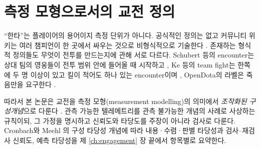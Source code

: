 \section{측정 모형으로서의 교전 정의}
\label{sec:rel-validity}

``한타''는 플레이어의 용어이지 측정 단위가 아니다. 공식적인 정의는 없고 커뮤니티 위키는 여러 챔피언이 한 곳에서 싸우는 것으로 비형식적으로 기술한다 \cite{lolwiki2026terminology}. 존재하는 형식적 정의들도 무엇이 전투를 만드는지에 관해 서로 다르다. Schubert 등의 encounter는 상대 팀의 영웅들이 전투 범위 안에 들어올 때 시작하고 \cite{schubert2016encounter}, Ke 등의 team fight는 한쪽에 두 명 이상이 있고 킬이 적어도 하나 있는 encounter이며 \cite{ke2022}, OpenDota의 라벨은 죽음만을 요구한다 \cite{opendota2018processteamfights,tot2021camera}.

따라서 본 논문은 교전을 측정 모형(measurement modelling)의 의미에서 \emph{조작화된 구성개념}으로 다룬다 \cite{jacobs2021measurement}. 관측 가능한 텔레메트리를 관측 불가능한 개념의 사례로 사상하는 규칙이되, 그 가정을 명시하고 신뢰도와 타당도를 주장이 아니라 검사로 다룬다. Cronbach와 Meehl \cite{cronbach1955construct}의 구성 타당성 개념에 따라 내용·수렴·판별 타당성과 검사--재검사 신뢰도, 예측 타당성을 제 \ref{ch:engagement} 장 끝에서 항목별로 요약한다.
